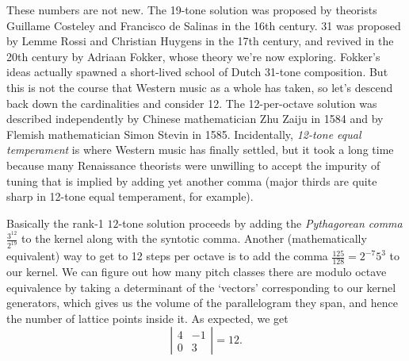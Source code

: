 \documentclass[12pt]{article}
\begin{document}
\par
These numbers are not new.  The 19-tone solution was proposed by theorists Guillame Costeley and Francisco de Salinas in the 16th century.  31 was proposed by Lemme Rossi and Christian Huygens in the 17th century, and revived in the 20th century by Adriaan Fokker, whose theory we're now exploring.  Fokker's ideas actually spawned a short-lived school of Dutch 31-tone composition. But this is not the course that Western music as a whole has taken, so let's descend back down the cardinalities and consider 12. The 12-per-octave solution was described independently by Chinese mathematician Zhu Zaiju in 1584 and by Flemish mathematician Simon Stevin in 1585.  Incidentally, \emph{12-tone equal temperament} is where Western music has finally settled, but it took a long time because many Renaissance theorists were unwilling to accept the impurity of tuning that is implied by adding yet another comma (major thirds are quite sharp in 12-tone equal temperament, for example).\\
\par
Basically the rank-1 $12$-tone solution proceeds by adding the \emph{Pythagorean comma} $\tfrac{3^{12}}{2^{19}}$ to the kernel along with the syntotic comma.  Another (mathematically equivalent) way to get to 12 steps per octave is to add the comma $\frac{125}{128}=2^{-7}5^{3}$ to our kernel.  We can figure out how many pitch classes there are modulo octave equivalence by taking a determinant of the `vectors' corresponding to our kernel generators, which gives us the volume of the parallelogram they span, and hence the number of lattice points inside it.  As expected, we get
\[\left|\begin{matrix}
4 & -1 \\
0 & 3
\end{matrix}\right| = 12\text{.}\]
\end{document}
